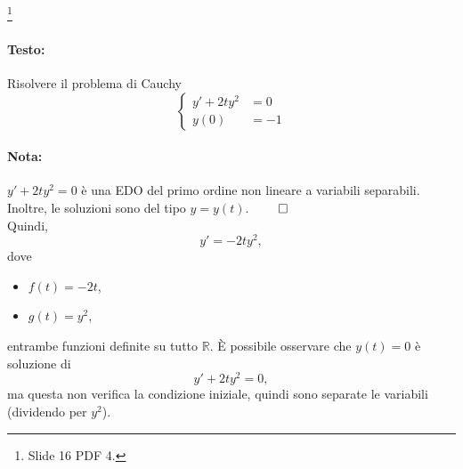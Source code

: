 \begin{example}\footnote{Slide 16 PDF 4.}
    \paragraph{Testo:} Risolvere il problema di Cauchy
    \begin{equation*}
        \begin{cases}
            y' + 2t y^2 &= 0\\
            y(0) &= -1
        \end{cases}
    \end{equation*}
    \paragraph{Nota:} $y' + 2t y^2 = 0$ è una EDO del primo ordine non lineare a variabili separabili. Inoltre, le soluzioni sono del tipo $y=y(t)$. $\qed$\\
    Quindi,
    \begin{equation*}
        y' = -2 t y^2,
    \end{equation*}
    dove
    \begin{itemize}
        \item $f(t) = -2t$,
        \item $g(t) = y^2$,
    \end{itemize}
    entrambe funzioni definite su tutto $\mathbb R$. È possibile osservare che $y(t)=0$ è soluzione di
    \begin{equation*}
        y' + 2ty^2 = 0,
    \end{equation*}
    ma questa non verifica la condizione iniziale, quindi sono separate le variabili (dividendo per $y^2$).

\end{example}

